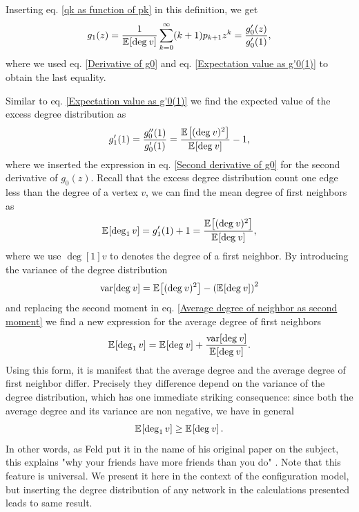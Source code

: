 \documentclass[
11pt, %
american, %
singlespacing, %
final, %
nolistspacing, %
liststotoc, %
headsepline, %
]{MastersDoctoralThesis} %
\begin{document}
Inserting eq. \eqref{qk as function of pk} in this definition, we get
\begin{align}
	g_1(z) = \frac{1}{\expected{\deg{v}}} \sum_{k=0}^\infty (k + 1) p_{k + 1} z^k = \frac{g'_0(z)}{g'_0(1)}, \label{g1 as a function of g0}
\end{align}
where we used eq. \eqref{Derivative of g0} and eq. \eqref{Expectation value as g'0(1)} to obtain the last equality.

Similar to eq. \eqref{Expectation value as g'0(1)} we find the expected value of the excess degree distribution as
\begin{align}
	g'_1(1) = \frac{g''_0(1)}{g'_0(1)} = \frac{\expected{(\deg{v})^2}}{\expected{\deg{v}}} - 1,
\end{align}
where we inserted the expression in eq. \eqref{Second derivative of g0} for the second derivative of $g_0(z)$. Recall that the excess degree distribution count one edge less than the degree of a vertex $v$, we can find the mean degree of first neighbors as
\begin{align}
	\expected{\deg[1]{v}} = g'_1(1) + 1 = \frac{\expected{(\deg{v})^2}}{\expected{\deg{v}}}, \label{Average degree of neighbor as second moment}
\end{align}
where we use $\deg[1]{v}$ to denotes the degree of a first neighbor. By introducing the variance of the degree distribution
\begin{align}
	\var{\deg{v}} &= \expected{(\deg{v})^2} - \left(\expected{\deg{v}}\right)^2 \\
\end{align}
and replacing the second moment in eq. \eqref{Average degree of neighbor as second moment} we find a new expression for the average degree of first neighbors
\begin{align}
	\expected{\deg[1]{v}} = \expected{\deg{v}} + \frac{\var{\deg{v}}}{\expected{\deg{v}}}.
\end{align}
Using this form, it is manifest that the average degree and the average degree of first neighbor differ. Precisely they difference depend on the variance of the degree distribution, which has one immediate striking consequence: since both the average degree and its variance are non negative, we have in general
\begin{align}
	\expected{\deg[1]{v}} \geq \expected{\deg{v}}. \label{Friends of friends inequality}
\end{align}
In other words, as Feld put it in the name of his original paper on the subject, this explains "why your friends have more friends than you do" \cite{feld1991friends}. Note that this feature is universal. We present it here in the context of the configuration model, but inserting the degree distribution of any network in the calculations presented leads to same result.
\end{document}
